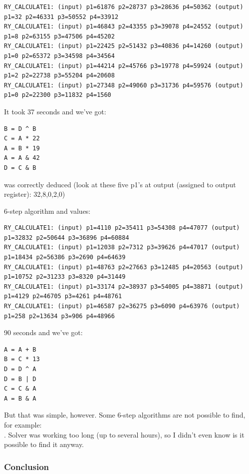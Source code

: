 \begin{lstlisting}
RY_CALCULATE1: (input) p1=61876 p2=28737 p3=28636 p4=50362 (output) p1=32 p2=46331 p3=50552 p4=33912
RY_CALCULATE1: (input) p1=46843 p2=43355 p3=39078 p4=24552 (output) p1=8 p2=63155 p3=47506 p4=45202
RY_CALCULATE1: (input) p1=22425 p2=51432 p3=40836 p4=14260 (output) p1=0 p2=65372 p3=34598 p4=34564
RY_CALCULATE1: (input) p1=44214 p2=45766 p3=19778 p4=59924 (output) p1=2 p2=22738 p3=55204 p4=20608
RY_CALCULATE1: (input) p1=27348 p2=49060 p3=31736 p4=59576 (output) p1=0 p2=22300 p3=11832 p4=1560
\end{lstlisting}

It took 37 seconds and we've got:

\begin{lstlisting}
B = D ^ B
C = A * 22
A = B * 19
A = A & 42
D = C & B
\end{lstlisting}

 was correctly deduced (look at these five p1's at output (assigned to output  register): 32,8,0,2,0)

6-step algorithm  and values:

\begin{lstlisting}
RY_CALCULATE1: (input) p1=4110 p2=35411 p3=54308 p4=47077 (output) p1=32832 p2=50644 p3=36896 p4=60884
RY_CALCULATE1: (input) p1=12038 p2=7312 p3=39626 p4=47017 (output) p1=18434 p2=56386 p3=2690 p4=64639
RY_CALCULATE1: (input) p1=48763 p2=27663 p3=12485 p4=20563 (output) p1=10752 p2=31233 p3=8320 p4=31449
RY_CALCULATE1: (input) p1=33174 p2=38937 p3=54005 p4=38871 (output) p1=4129 p2=46705 p3=4261 p4=48761
RY_CALCULATE1: (input) p1=46587 p2=36275 p3=6090 p4=63976 (output) p1=258 p2=13634 p3=906 p4=48966
\end{lstlisting}

90 seconds and we've got:

\begin{lstlisting}
A = A + B
B = C * 13
D = D ^ A
D = B | D
C = C & A
A = B & A
\end{lstlisting}

But that was simple, however. 
Some 6-step algorithms are not possible to find, for example: \\
.
Solver was working too long (up to several hours), so I didn't even know is it possible to find it anyway.

\subsubsection{Conclusion}

